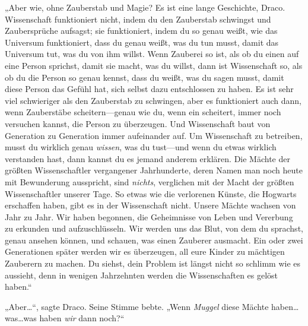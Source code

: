 „Aber wie, ohne Zauberstab und Magie? Es ist eine lange Geschichte, Draco. Wissenschaft funktioniert nicht, indem du den Zauberstab schwingst und Zaubersprüche aufsagst; sie funktioniert, indem du so genau weißt, wie das Universum funktioniert, dass du genau weißt, was du tun musst, damit das Universum tut, was du von ihm willst. Wenn Zauberei so ist, als ob du einen  auf eine Person sprichst, damit sie macht, was du willst, dann ist Wissenschaft so, als ob du die Person so genau kennst, dass du weißt, was du sagen musst, damit diese Person das Gefühl hat, sich selbst dazu entschlossen zu haben. Es ist sehr viel schwieriger als den Zauberstab zu schwingen, aber es funktioniert auch dann, wenn Zauberstäbe scheitern—genau wie du, wenn ein  scheitert, immer noch versuchen kannst, die Person zu überzeugen. Und Wissenschaft baut von Generation zu Generation immer aufeinander auf. Um Wissenschaft zu betreiben, musst du wirklich genau \emph{wissen}, was du tust—und wenn du etwas wirklich verstanden hast, dann kannst du es jemand anderem erklären. Die Mächte der größten Wissenschaftler vergangener Jahrhunderte, deren Namen man noch heute mit Bewunderung ausspricht, sind \emph{nichts}, verglichen mit der Macht der größten Wissenschaftler unserer Tage. So etwas wie die verlorenen Künste, die Hogwarts erschaffen haben, gibt es in der Wissenschaft nicht. Unsere Mächte wachsen von Jahr zu Jahr. Wir haben begonnen, die Geheimnisse von Leben und Vererbung zu erkunden und aufzuschlüsseln. Wir werden uns das Blut, von dem du sprachst, genau ansehen können, und schauen, was einen Zauberer ausmacht. Ein oder zwei Generationen später werden wir es überzeugen, all eure Kinder zu mächtigen Zauberern zu machen. Du siehst, dein Problem ist längst nicht so schlimm wie es aussieht, denn in wenigen Jahrzehnten werden die Wissenschaften es gelöst haben.“

„Aber…“, sagte Draco. Seine Stimme bebte. „Wenn \emph{Muggel} diese Mächte haben…was…was haben \emph{wir} dann noch?“

